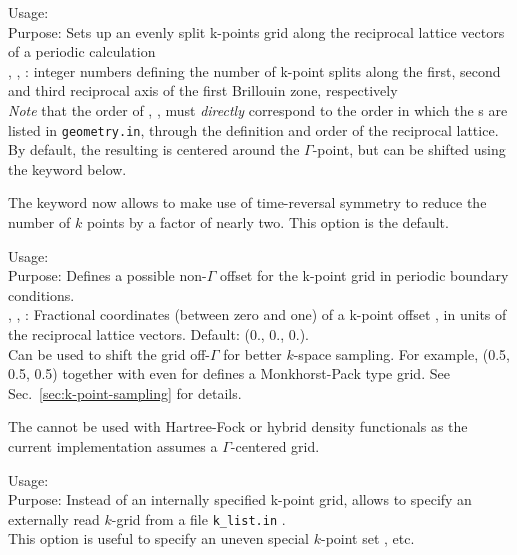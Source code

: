 {
  \noindent
  Usage:     \\[1.0ex]
  Purpose: Sets up an evenly split k-points grid along the reciprocal
    lattice vectors of a periodic calculation \\[1.0ex]
  , ,  : integer numbers defining the
    number of k-point splits along the first, second and third
    reciprocal axis of the first Brillouin zone, respectively \\
}
\emph{Note} that the order of , , 
must \emph{directly} correspond to the order in which the
s are listed in \texttt{geometry.in}, through
the definition and order of the reciprocal lattice. By
default, the resulting  is centered around the
$\Gamma$-point, but can be shifted using the 
keyword below.

The keyword  now allows to make use of
time-reversal symmetry to reduce the number of $k$ points by a factor of
nearly two. This option is the default.

{
  \noindent
  Usage:     \\[1.0ex]
  Purpose: Defines a possible non-$\Gamma$ offset for the k-point grid
    in periodic boundary conditions. \\[1.0ex]
  , ,  : Fractional coordinates
    (between zero and one) of a k-point offset , in units of the
    reciprocal lattice vectors. Default: (0., 0., 0.). \\
}
Can be used to shift the grid off-$\Gamma$ for better $k$-space
sampling. For example, (0.5, 0.5, 0.5) together with even  for
 defines a Monkhorst-Pack
\cite{Monkhorst76} type grid.  See Sec.~\ref{sec:k-point-sampling} for
details.

The  cannot be used with Hartree-Fock or hybrid density functionals
as the current implementation assumes a $\Gamma$-centered grid.

{
  \noindent
  Usage:  \\[1.0ex]
  Purpose: Instead of an internally specified k-point grid, allows to
    specify an externally read $k$-grid from a file
    \texttt{k\_list.in} .\\
}
This option is useful
to specify an uneven special $k$-point set \cite{Chadi73}, etc.

